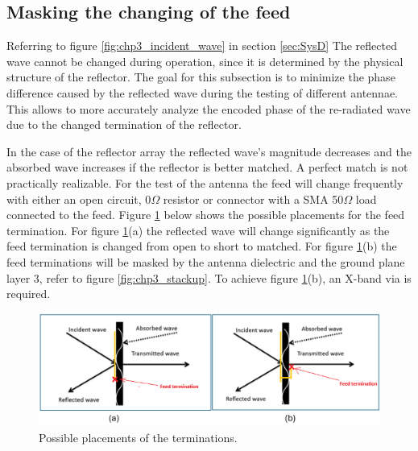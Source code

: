 \subsection{Masking the changing of the feed}
Referring to figure \ref{fig:chp3_incident_wave} in section \ref{sec:SysD} The reflected wave cannot be changed during operation, since it is determined by the physical structure of the reflector. The goal for this subsection is to minimize the phase difference caused by the reflected wave during the testing of different antennae. This allows to more accurately analyze the encoded phase of the re-radiated wave due to the changed termination of the reflector.

In the case of the reflector array the reflected wave’s magnitude decreases and the absorbed wave increases if the reflector is better matched. A perfect match is not practically realizable. For the test of the antenna the feed will change frequently with either an open circuit, 0$\Omega$ resistor or connector with a SMA 50$\Omega$ load connected to the feed. Figure \ref{fig:chp3_incident_wave_termination} below shows the possible placements for the feed termination. For figure \ref{fig:chp3_incident_wave_termination}(a) the reflected wave will change significantly as the feed termination is changed from open to short to matched.  For figure \ref{fig:chp3_incident_wave_termination}(b) the feed terminations will be masked by the antenna dielectric and the ground plane layer 3, refer to figure \ref{fig:chp3_stackup}. To achieve figure \ref{fig:chp3_incident_wave_termination}(b), an X-band via is required.

    \begin{figure}[H]
    \centering
    \includegraphics[width=0.7\linewidth]{Figures/chp3_incident_wave_termination.png}
    \caption{Possible placements of the terminations.}
    \label{fig:chp3_incident_wave_termination}
    \end{figure}

